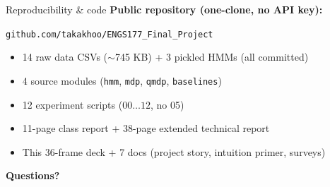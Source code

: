 \documentclass[11pt,aspectratio=169]{beamer}
\begin{document}
\begin{frame}{Reproducibility \& code}
\bigskip
\centering
\textbf{Public repository (one-clone, no API key):}

\medskip
{\Large\texttt{github.com/takakhoo/ENGS177\_Final\_Project}}

\bigskip\small
\begin{itemize}\setlength{\itemsep}{4pt}
  \item 14 raw data CSVs ($\sim$745 KB) + 3 pickled HMMs (all committed)
  \item 4 source modules (\texttt{hmm}, \texttt{mdp}, \texttt{qmdp}, \texttt{baselines})
  \item 12 experiment scripts ($00\ldots 12$, no 05)
  \item 11-page class report + 38-page extended technical report
  \item This 36-frame deck + 7 docs (project story, intuition primer, surveys)
\end{itemize}

\bigskip
\centering\Large\textbf{Questions?}
\end{frame}
\end{document}
